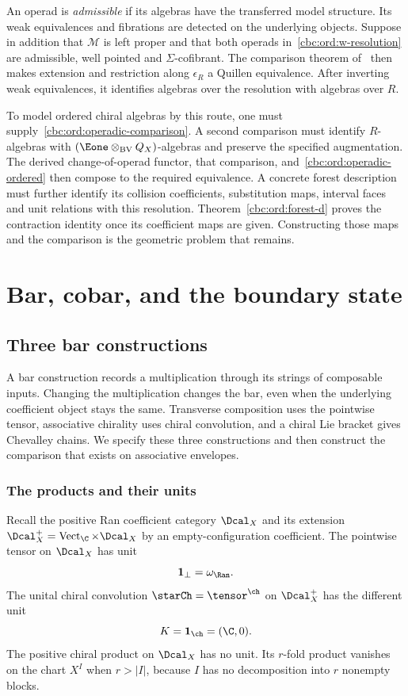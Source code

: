 An operad is \emph{admissible} if its algebras have the transferred model structure. Its weak equivalences and fibrations are detected on the underlying objects. Suppose in addition that $\mathcal M$ is left proper and that both operads in~\eqref{cbc:ord:w-resolution} are admissible, well pointed and $\Sigma$-cofibrant. The comparison theorem of~\cite[Theorem~4.1]{BergerMoerdijk2007} then makes extension and restriction along $\epsilon_R$ a Quillen equivalence. After inverting weak equivalences, it identifies algebras over the resolution with algebras over $R$.

To model ordered chiral algebras by this route, one must supply~\eqref{cbc:ord:operadic-comparison}. A second comparison must identify $R$-algebras with $(\Eone\otimes_{\mathrm{BV}}Q_X)$-algebras and preserve the specified augmentation. The derived change-of-operad functor, that comparison, and~\eqref{cbc:ord:operadic-ordered} then compose to the required equivalence. A concrete forest description must further identify its collision coefficients, substitution maps, interval faces and unit relations with this resolution. Theorem~\ref{cbc:ord:forest-d} proves the contraction identity once its coefficient maps are given. Constructing those maps and the comparison is the geometric problem that remains.


\part{Bar, cobar, and the boundary state}


\chapter{Three bar constructions}\label{cbc:bars:chapter}
A bar construction records a multiplication through its strings of composable inputs. Changing the multiplication changes the bar, even when the underlying coefficient object stays the same. Transverse composition uses the pointwise tensor, associative chirality uses chiral convolution, and a chiral Lie bracket gives Chevalley chains. We specify these three constructions and then construct the comparison that exists on associative envelopes.

\section{The products and their units}
Recall the positive Ran coefficient category $\Dcal_X$ and its extension $\Dcal_X^+=\operatorname{Vect}_{\C}\times\Dcal_X$ by an empty-configuration coefficient. The pointwise tensor on $\Dcal_X$ has unit
\[
 \mathbf1_\perp=\omega_{\Ran}.
\]
The unital chiral convolution $\starCh=\tensor^{\ch}$ on $\Dcal_X^+$ has the different unit
\[
 K=\mathbf1_{\ch}=(\C,0).
\]
The positive chiral product on $\Dcal_X$ has no unit. Its $r$-fold product vanishes on the chart $X^I$ when $r>|I|$, because $I$ has no decomposition into $r$ nonempty blocks.

